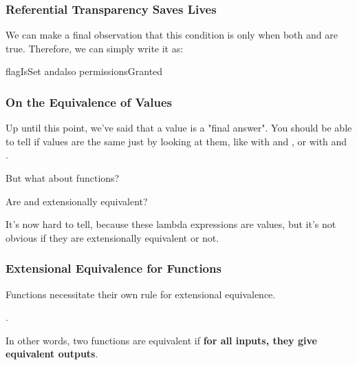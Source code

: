 \documentclass[aspectratio=169, handout]{beamer}
\begin{document}
\begin{frame}[fragile]
  \frametitle{Referential Transparency Saves Lives}

  We can make a final observation that this condition is only
   when both  and 
  are true. Therefore, we can simply write it as:

  \pause
  \vspace{\fill}

  \begin{codeblock}
    flagIsSet andalso permissionsGranted
  \end{codeblock}

  \pause
  \vspace{\fill}


\end{frame}

\begin{frame}[fragile]
  \frametitle{On the Equivalence of Values}

  Up until this point, we've said that a value is a "final answer". You should be able
  to tell if values are the same just by looking at them, like with  and ,
  or with  and .

  \vspace{\fill}

  But what about functions?

  \pause
  \vspace{5pt}

  Are  and  extensionally equivalent?

  \pause
  \vspace{\fill}

  It's now hard to tell, because these lambda expressions are values, but it's not obvious
  if they are extensionally equivalent or not.
\end{frame}

\begin{frame}[fragile]
  \frametitle{Extensional Equivalence for Functions}

  Functions necessitate their own rule for extensional equivalence.

  \pause
  \vspace{\fill}

  .

  \pause
  \vspace{5pt}

  In other words, two functions are equivalent if \textbf{for all inputs, they give equivalent outputs}.

  \pause
  \vspace{\fill}

\end{frame}
\end{document}
